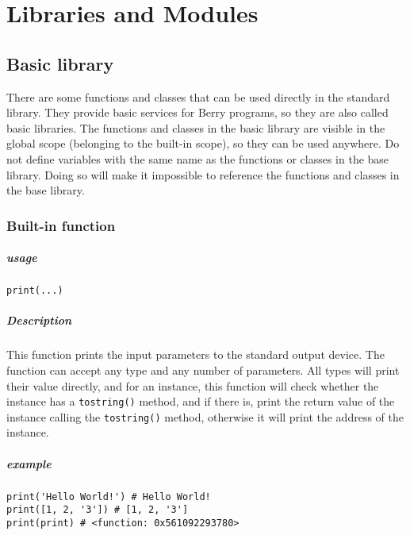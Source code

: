 \chapter {Libraries and Modules}

\section {Basic library}

There are some functions and classes that can be used directly in the standard library. They provide basic services for Berry programs, so they are also called basic libraries. The functions and classes in the basic library are visible in the global scope (belonging to the built-in scope), so they can be used anywhere. Do not define variables with the same name as the functions or classes in the base library. Doing so will make it impossible to reference the functions and classes in the base library.

\subsection {Built-in function}


\paragraph{usage}
\begin{lstlisting}[language=berry, numbers=none]
print(...)
\end{lstlisting}

\paragraph{Description}
This function prints the input parameters to the standard output device. The function can accept any type and any number of parameters. All types will print their value directly, and for an instance, this function will check whether the instance has a \texttt{tostring()} method, and if there is, print the return value of the instance calling the \texttt{tostring()} method, otherwise it will print the address of the instance.

\paragraph{example}
\begin{lstlisting}[language=berry, numbers=none]
print('Hello World!') # Hello World!
print([1, 2, '3']) # [1, 2, '3']
print(print) # <function: 0x561092293780>
\end{lstlisting}

